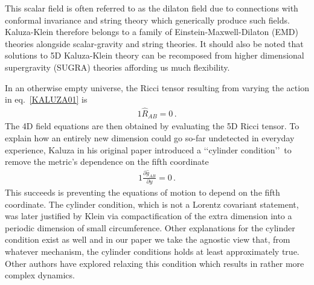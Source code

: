 This scalar field is often referred to as the dilaton field due to connections with conformal invariance and string theory which generically produce such fields. Kaluza-Klein therefore belongs to a family of Einstein-Maxwell-Dilaton (EMD) theories alongside scalar-gravity and string theories. It should also be noted that solutions to 5D Kaluza-Klein theory can be recomposed from higher dimensional supergravity (SUGRA) theories affording us much flexibility. 

In an otherwise empty universe, the Ricci tensor resulting from varying the action in eq.~\eqref{KALUZA01} is
\begin{alignat}{1}
	\label{KALUZA02} \hat{R}_{AB}=0\,.
\end{alignat}
The 4D field equations are then obtained by evaluating the 5D Ricci tensor. To explain how an entirely new dimension could go so-far undetected in everyday experience, Kaluza in his original paper introduced a \lq\lq cylinder condition\rq\rq\ to remove the metric's dependence on the fifth coordinate
\begin{alignat}{1}
	\label{KALUZA03} \frac{\partial\hat{g}_{AB}}{\partial y}=0\,.
\end{alignat}
This succeeds is preventing the equations of motion to depend on the fifth coordinate. The cylinder condition, which is not a Lorentz covariant statement, was later justified by Klein via compactification of the extra dimension into a periodic dimension of small circumference. Other explanations for the cylinder condition exist as well and in our paper we take the agnostic view that, from whatever mechanism, the cylinder conditions holds at least approximately true. Other authors have explored relaxing this condition which results in rather more complex dynamics.

